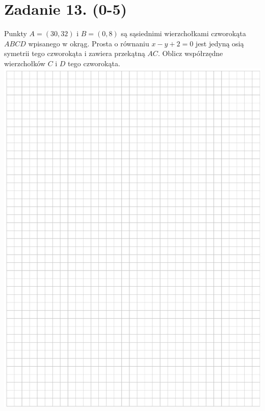\documentclass[10pt]{article}
\begin{document}
\section*{Zadanie 13. (0-5)}
Punkty \(A=(30,32)\) i \(B=(0,8)\) są sąsiednimi wierzchołkami czworokąta \(A B C D\) wpisanego w okrąg. Prosta o równaniu \(x-y+2=0\) jest jedyną osią symetrii tego czworokąta i zawiera przekątną \(A C\). Oblicz współrzędne wierzchołków \(C\) i \(D\) tego czworokąta.\\
\includegraphics[max width=\textwidth, center]{2024_11_21_054c332d5c02f869c372g-14}\\
\end{document}
